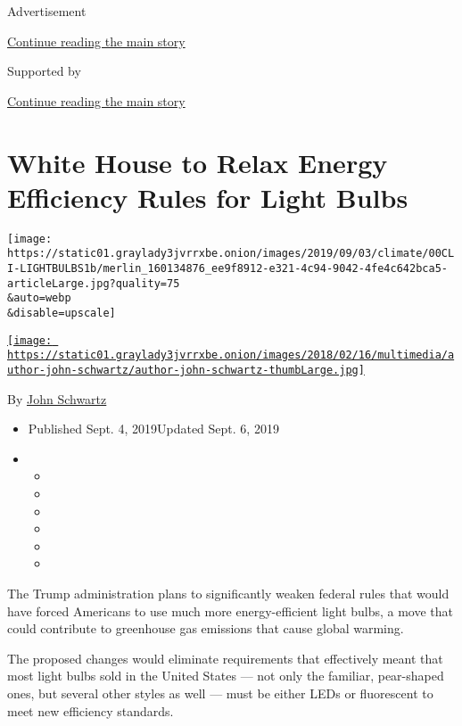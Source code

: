 Advertisement

\protect\hyperlink{after-top}{Continue reading the main story}

Supported by

\protect\hyperlink{after-sponsor}{Continue reading the main story}

\hypertarget{white-house-to-relax-energy-efficiency-rules-for-light-bulbs}{%
\section{White House to Relax Energy Efficiency Rules for Light
Bulbs}\label{white-house-to-relax-energy-efficiency-rules-for-light-bulbs}}

\texttt{[image: https://static01.graylady3jvrrxbe.onion/images/2019/09/03/climate/00CLI-LIGHTBULBS1b/merlin\_160134876\_ee9f8912-e321-4c94-9042-4fe4c642bca5-articleLarge.jpg?quality=75\\\&auto=webp\\\&disable=upscale]}

\href{https://www.nytimes3xbfgragh.onion/by/john-schwartz}{\texttt{[image: https://static01.graylady3jvrrxbe.onion/images/2018/02/16/multimedia/author-john-schwartz/author-john-schwartz-thumbLarge.jpg]}}

By \href{https://www.nytimes3xbfgragh.onion/by/john-schwartz}{John
Schwartz}

\begin{itemize}
\item
  Published Sept. 4, 2019Updated Sept. 6, 2019
\item
  \begin{itemize}
  \item
  \item
  \item
  \item
  \item
  \item
  \end{itemize}
\end{itemize}

The Trump administration plans to significantly weaken federal rules
that would have forced Americans to use much more energy-efficient light
bulbs, a move that could contribute to greenhouse gas emissions that
cause global warming.

The proposed changes would eliminate requirements that effectively meant
that most light bulbs sold in the United States --- not only the
familiar, pear-shaped ones, but several other styles as well --- must be
either LEDs or fluorescent to meet new efficiency standards.

